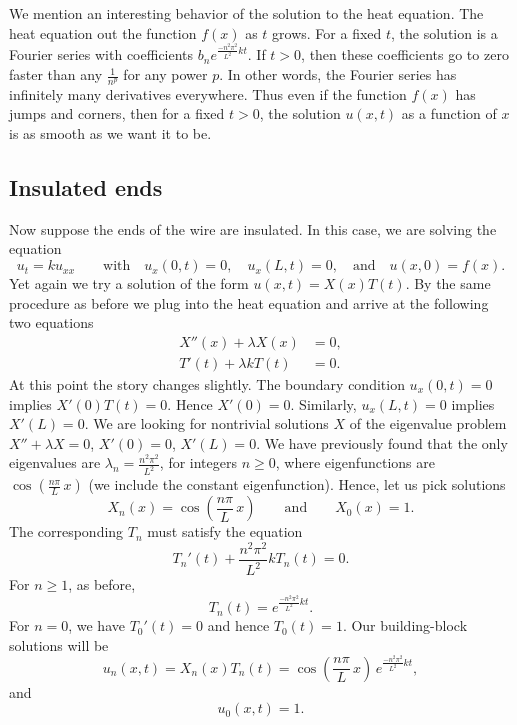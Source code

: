 \documentclass[12pt]{book}
\begin{document}
We mention an interesting behavior of the solution to the heat equation.
The heat equation
 out the function $f(x)$ as $t$ grows.  For a fixed $t$,
the solution is a Fourier series with coefficients
$b_n e^{\frac{-n^2 \pi^2}{L^2} k t}$.  If $t > 0$, then these coefficients
go to zero faster than any $\frac{1}{n^p}$ for any power $p$.  In other
words, the Fourier series has infinitely many derivatives everywhere.
Thus even if the function $f(x)$ has jumps and corners, then for
a fixed $t > 0$, the solution
$u(x,t)$ as a function of $x$ is as smooth as we want it
to be.

\subsection{Insulated ends}

Now suppose the ends of the wire are insulated.  In this case, we are solving
the equation
\begin{equation*}
u_t = k u_{xx}
\qquad \text{with} \quad
u_x(0,t) = 0, \quad u_x(L,t) = 0,
\quad \text{and} \quad u(x,0) = f(x) .
\end{equation*}
Yet again we try a solution of the form $u(x,t) = X(x)T(t)$.  By the same
procedure as before we plug into the heat equation and arrive at the
following
two equations
\begin{align*}
X''(x) + \lambda X(x) &= 0 , \\
T'(t) + \lambda k T(t) &= 0 .
\end{align*}
At this point the story changes slightly.
The boundary condition $u_x(0,t) = 0$ implies $X'(0)T(t) = 0$.
Hence $X'(0) = 0$.  Similarly, $u_x(L,t) = 0$ implies $X'(L) = 0$.  We
are looking for nontrivial solutions $X$ of the eigenvalue problem
$X'' + \lambda X = 0$, $X'(0) = 0$, $X'(L) = 0$.  We have previously found that
the only eigenvalues are $\lambda_n = \frac{n^2 \pi^2}{L^2}$, for integers
$n \geq 0$,
where eigenfunctions are $\cos \left( \frac{n \pi}{L} \, x\right)$
(we include the constant
eigenfunction).  Hence, let us pick
solutions
\begin{equation*}
X_n (x) = \cos \left( \frac{n \pi}{L} \, x \right)
\qquad \text{and} \qquad
X_0 (x) = 1.
\end{equation*}
The corresponding $T_n$ must satisfy the equation
\begin{equation*}
T_n'(t) + \frac{n^2 \pi^2}{L^2} k T_n(t) = 0 .
\end{equation*}
For $n \geq 1$, as before,
\begin{equation*}
T_n(t) = e^{\frac{-n^2 \pi^2}{L^2} k t} .
\end{equation*}
For $n = 0$, we have $T_0'(t) = 0$ and hence $T_0(t) = 1$.
Our building-block solutions will be
\begin{equation*}
u_n(x,t) = X_n(x)T_n(t) =
\cos \left( \frac{n \pi}{L} \, x \right)
\, e^{\frac{-n^2 \pi^2}{L^2} k t} ,
\end{equation*}
and
\begin{equation*}
u_0(x,t) = 1 .
\end{equation*}
\end{document}
